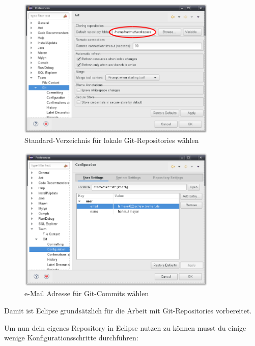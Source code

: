 \begin{figure}[h]
  \centering
   \includegraphics[width=0.85\textwidth]{./inf/SEKII/01_Vorbereitung/Eclipse-Git-Configuration-1.png}
   \caption{Standard-Verzeichnis für lokale Git-Repositories wählen}
   \label{fig:eclipse-git-configuration-1}
\end{figure}

\begin{figure}[h]
  \centering
   \includegraphics[width=0.85\textwidth]{./inf/SEKII/01_Vorbereitung/Eclipse-Git-Configuration-2.png}
   \caption{e-Mail Adresse für Git-Commits wählen}
   \label{fig:eclipse-git-configuration-2}
\end{figure}

\afterpage{\clearpage}

Damit ist Eclipse grundsätzlich für die Arbeit mit Git-Repositories vorbereitet.

Um nun dein eigenes Repository in Eclipse nutzen zu können musst du einige
wenige Konfigurationsschritte durchführen:

